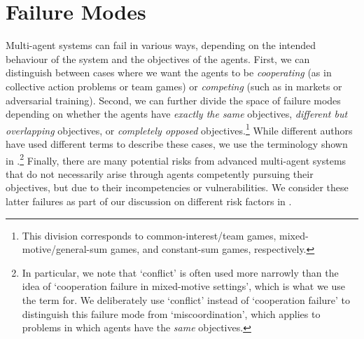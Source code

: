 \documentclass[a4paper]{article}
\begin{document}
\newpage

\tableofcontents

\newpage






\section{Failure Modes}
\label{sec:failure_modes}

Multi-agent systems can fail in various ways, depending on the intended behaviour of the system and the objectives of the agents.
First, we can distinguish between cases where we want the agents to be \emph{cooperating} (as in collective action problems or team games) or \emph{competing} (such as in markets or adversarial training).
Second, we can further divide the space of failure modes depending on whether the agents have \emph{exactly the same} objectives, \emph{different but overlapping} objectives, or \emph{completely opposed} objectives.\footnote{This division corresponds to common-interest/team games, mixed-motive/general-sum games, and constant-sum games, respectively.}
While different authors have used different terms to describe these cases, we use the terminology shown in .\footnote{In particular, we note that `conflict' is often used more narrowly than the idea of `cooperation failure in mixed-motive settings', which is what we use the term for. We deliberately use `conflict' instead of `cooperation failure' to distinguish this failure mode from `miscoordination', which applies to problems in which agents have the \textit{same} objectives.}
Finally, there are many potential risks from advanced multi-agent systems that do not necessarily arise through agents competently pursuing their objectives, but due to their incompetencies or vulnerabilities.
We consider these latter failures as part of our discussion on different risk factors in .
\end{document}
